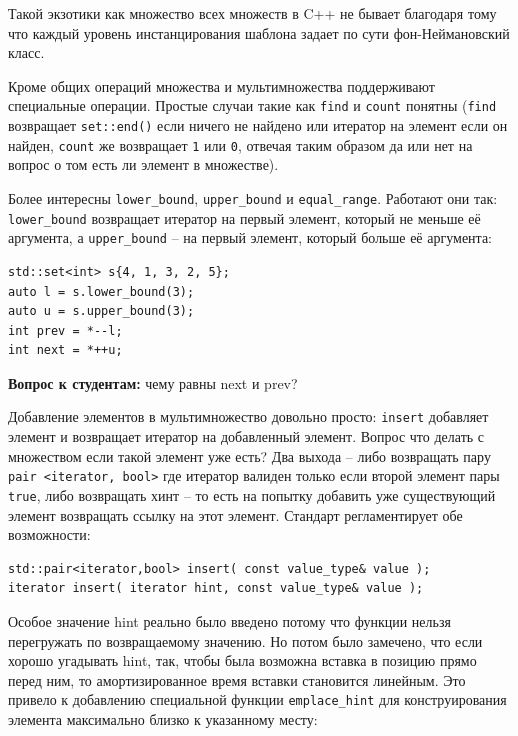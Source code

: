 \documentclass[a4paper,12pt,oneside]{article}
\newif\ifanswers
\begin{document}
Такой экзотики как множество всех множеств в C++ не бывает благодаря тому что каждый уровень инстанцирования шаблона задает по сути фон-Неймановский класс.
\fi

Кроме общих операций множества и мультимножества поддерживают специальные операции. Простые случаи такие как \lstinline!find! и \lstinline!count! понятны (\lstinline!find! возвращает \lstinline!set::end()! если ничего не найдено или итератор на элемент если он найден, \lstinline!count! же возвращает \lstinline!1! или \lstinline!0!, отвечая таким образом да или нет на вопрос о том есть ли элемент в множестве).

Более интересны \lstinline!lower_bound!, \lstinline!upper_bound! и \lstinline!equal_range!. Работают они так: \lstinline!lower_bound! возвращает итератор на первый элемент, который не меньше её аргумента, а \lstinline!upper_bound! -- на первый элемент, который больше её аргумента:

\begin{lstlisting}
std::set<int> s{4, 1, 3, 2, 5};
auto l = s.lower_bound(3);
auto u = s.upper_bound(3);
int prev = *--l;
int next = *++u;
\end{lstlisting}

\textbf{Вопрос к студентам:} чему равны next и prev?

\ifanswers
Верный ответ: конечно же 2 и 5 соответственно (2 потому что lower bound указывает на элемент 3, а 5 потому что upper bound указывает на 4).
\fi

Добавление элементов в мультимножество довольно просто: \lstinline!insert! добавляет элемент и возвращает итератор на добавленный элемент. Вопрос что делать с множеством если такой элемент уже есть? Два выхода -- либо возвращать пару \lstinline!pair <iterator, bool>! где итератор валиден только если второй элемент пары \lstinline!true!, либо возвращать хинт -- то есть на попытку добавить уже существующий элемент возвращать ссылку на этот элемент. Стандарт регламентирует обе возможности:

\begin{lstlisting}
std::pair<iterator,bool> insert( const value_type& value );
iterator insert( iterator hint, const value_type& value );
\end{lstlisting}

Особое значение hint реально было введено потому что функции нельзя перегружать по возвращаемому значению. Но потом было замечено, что если хорошо угадывать hint, так, чтобы была возможна вставка в позицию прямо перед ним, то амортизированное время вставки становится линейным. Это привело к добавлению специальной функции \lstinline!emplace_hint! для конструирования элемента максимально близко к указанному месту:
\end{document}
